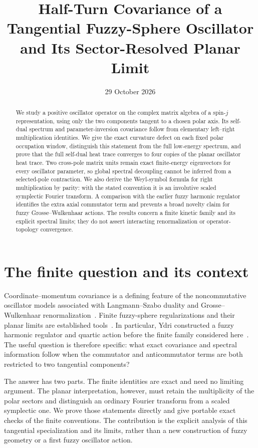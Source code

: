\documentclass[11pt,a4paper]{article}
\title{Half-Turn Covariance of a Tangential Fuzzy-Sphere Oscillator\\and Its Sector-Resolved Planar Limit}
\author{}
\date{29 October 2026}
\theoremstyle{remark}\newtheorem{remark}[theorem]{Remark}
\begin{document}
\maketitle
\begin{abstract}
We study a positive oscillator operator on the complex matrix algebra of a spin-$j$ representation, using only the two components tangent to a chosen polar axis.
Its self-dual spectrum and parameter-inversion covariance follow from elementary left--right multiplication identities.
We give the exact curvature defect on each fixed polar occupation window, distinguish this statement from the full low-energy spectrum, and prove that the full self-dual heat trace converges to four copies of the planar oscillator heat trace.
Two cross-pole matrix units remain exact finite-energy eigenvectors for every oscillator parameter, so global spectral decoupling cannot be inferred from a selected-pole contraction.
We also derive the Weyl-symbol formula for right multiplication by parity: with the stated convention it is an involutive scaled symplectic Fourier transform.
A comparison with the earlier fuzzy harmonic regulator identifies the extra axial commutator term and prevents a broad novelty claim for fuzzy Grosse--Wulkenhaar actions.
The results concern a finite kinetic family and its explicit spectral limits; they do not assert interacting renormalization or operator-topology convergence.
\end{abstract}

\section{The finite question and its context}
Coordinate--momentum covariance is a defining feature of the noncommutative oscillator models associated with Langmann--Szabo duality and Grosse--Wulkenhaar renormalization~\citep{LangmannSzabo2002,GrosseWulkenhaar2005}.
Finite fuzzy-sphere regularizations and their planar limits are established tools~\citep{ChuMadoreSteinacker2001}.
In particular, Ydri constructed a fuzzy harmonic regulator and quartic action before the finite family considered here~\citep[Sec.~4.2]{Ydri2014}.
The useful question is therefore specific: what exact covariance and spectral information follow when the commutator and anticommutator terms are both restricted to two tangential components?

The answer has two parts.
The finite identities are exact and need no limiting argument.
The planar interpretation, however, must retain the multiplicity of the polar sectors and distinguish an ordinary Fourier transform from a scaled symplectic one.
We prove those statements directly and give portable exact checks of the finite conventions.
The contribution is the explicit analysis of this tangential specialization and its limits, rather than a new construction of fuzzy geometry or a first fuzzy oscillator action.
\end{document}
